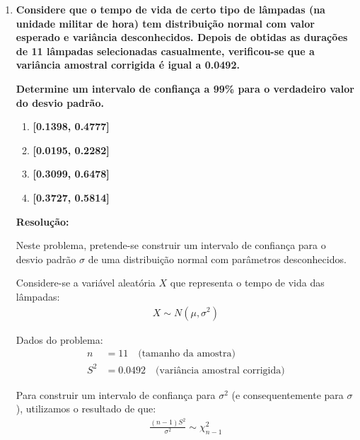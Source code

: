 \documentclass[a4paper,12pt]{article}
\begin{document}
\begin{enumerate}
    \vspace{0.5cm}

    \item \textbf{Considere que o tempo de vida de certo tipo de lâmpadas (na unidade militar de hora) tem distribuição normal com valor esperado e variância desconhecidos. Depois de obtidas as durações de 11 lâmpadas selecionadas casualmente, verificou-se que a variância amostral corrigida é igual a 0.0492.}

    \textbf{Determine um intervalo de confiança a 99\% para o verdadeiro valor do desvio padrão.}

    \vspace{0.3cm}

    \begin{enumerate}[label=\Alph*)]
        \item \textbf{[0.1398, 0.4777]}
        \item \textbf{[0.0195, 0.2282]}
        \item \textbf{[0.3099, 0.6478]}
        \item \textbf{[0.3727, 0.5814]}
    \end{enumerate}

    \vspace{0.3cm}

    \begin{mdframed}[backgroundcolor=gray!10, linewidth=0pt, innertopmargin=10pt, innerbottommargin=10pt]
    \textbf{Resolução:}
    
    Neste problema, pretende-se construir um intervalo de confiança para o desvio padrão $\sigma$ de uma distribuição normal com parâmetros desconhecidos.

    Considere-se a variável aleatória $X$ que representa o tempo de vida das lâmpadas:
    \begin{align*}
    X \sim N(\mu, \sigma^2)
    \end{align*}

    Dados do problema:
    \begin{align*}
    n &= 11 \quad \text{(tamanho da amostra)} \\
    S^2 &= 0.0492 \quad \text{(variância amostral corrigida)}
    \end{align*}

    Para construir um intervalo de confiança para $\sigma^2$ (e consequentemente para $\sigma$), utilizamos o resultado de que:
    \begin{align*}
    \frac{(n-1)S^2}{\sigma^2} \sim \chi^2_{n-1}
    \end{align*}


\end{mdframed}
\end{enumerate}
\end{document}
